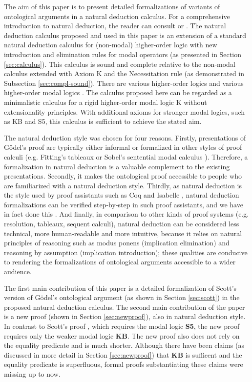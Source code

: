 \documentclass[smallextended]{svjour3}
\begin{document}
The aim of this paper is to present detailed formalizations of variants of ontological arguments in a natural deduction calculus. For a comprehensive introduction to natural deduction, the reader can consult \citep{prawitz} or \citep{gabbay}. The natural deduction calculus proposed and used in this paper is an extension of a standard natural deduction calculus for (non-modal) higher-order logic \citep{BenzmuellerBrownKohlhase} with new introduction and elimination rules for modal operators (as presented in Section \ref{sec:calculus}). This calculus is sound and complete relative to the non-modal calculus extended with Axiom K and the Necessitation rule (as demonstrated in Subsection \ref{sec:compl-sound}). There are various higher-order logics \citep{BenzmuellerBrownKohlhase} and various higher-order modal logics \citep{Muskens}. The calculus proposed here can be regarded as a minimalistic calculus for a rigid higher-order modal logic K without extensionality principles. With additional axioms for stronger modal logics, such as KB and S5, this calculus is sufficient to achieve the stated aim.

The natural deduction style was chosen for four reasons. Firstly, presentations of G\"odel's proof are typically either informal or formalized in other styles of proof calculi (e.g. Fitting's tableaux \citep{fitting} or Sobel's sentential modal calculus \citep{sobel2}). Therefore, a formalization in natural deduction is a valuable complement to the existing presentations. Secondly, it makes the ontological proof accessible to people who are familiarized with a natural deduction style. Thirdly, as natural deduction is the style used by proof assistants such as Coq \citep{coq} and Isabelle \citep{isabelle}, natural deduction formalizations can be verified step-by-step in such proof assistants, and we have in fact done this \citep{CSRModalLogicInCoq}. And finally, in comparison to other kinds of proof systems (e.g. resolution, tableaux, sequent calculi), natural deduction can be considered less technical, more human-readable and more intuitive, because it relies on natural principles of reasoning such as modus ponens (implication elimination) and reasoning by assumption (implication introduction); these qualities are conducive to rendering the formalizations of ontological arguments accessible to a wider audience.

The first main contribution of this paper is a detailed formalization of Scott's version \citep{scott} of G\"odel's ontological argument \citep{Goedel} (as shown in Section \ref{sec:scott}) in the proposed natural deduction calculus. The second main contribution of the paper is a new proof (shown in Section \ref{sec:newproof}), also in natural deduction style. In contrast to Scott's proof \citep{scott}, which requires the modal logic \textbf{S5}, the new proof requires only the weaker modal logic \textbf{KB}. The new proof also does not rely on the equality predicate and is much shorter. Although there have been claims (as discussed in more detail in Section \ref{sec:newproof}) that \textbf{KB} is sufficent and the equality predicate is superfluous, formal proofs substantiating these claims were missing up to now.
\end{document}
